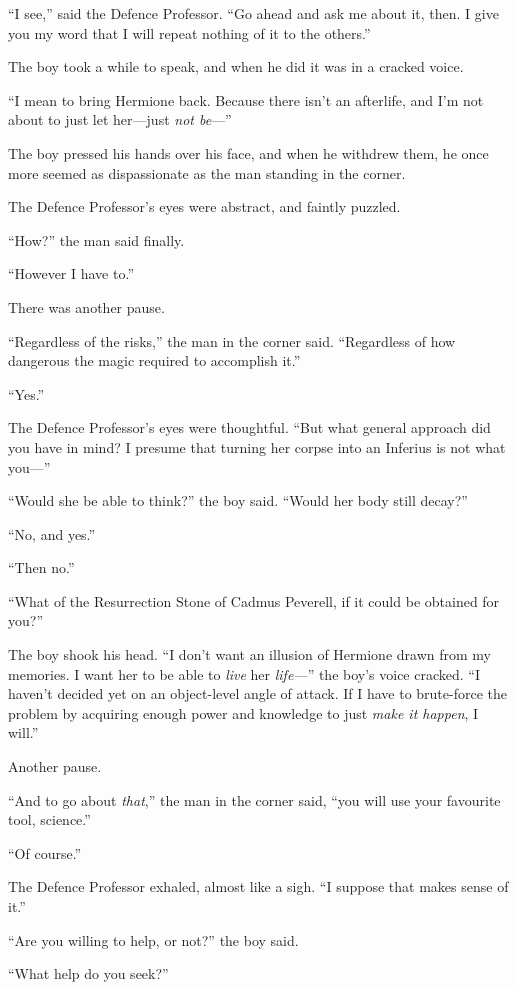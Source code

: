 “I see,” said the Defence Professor.
“Go ahead and ask me about it, then. I give you my word that I will repeat nothing of it to the others.”

The boy took a while to speak, and when he did it was in a cracked voice.

“I mean to bring Hermione back. Because there isn’t an afterlife, and I’m not about to just let her—just \emph{not be}—”

The boy pressed his hands over his face, and when he withdrew them, he once more seemed as dispassionate as the man standing in the corner.

The Defence Professor’s eyes were abstract, and faintly puzzled.

“How?” the man said finally.

“However I have to.”

There was another pause.

“Regardless of the risks,” the man in the corner said.
“Regardless of how dangerous the magic required to accomplish it.”

“Yes.”

The Defence Professor’s eyes were thoughtful.
“But what general approach did you have in mind? I presume that turning her corpse into an Inferius is not what you—”

“Would she be able to think?” the boy said.
“Would her body still decay?”

“No, and yes.”

“Then no.”

“What of the Resurrection Stone of Cadmus Peverell, if it could be obtained for you?”

The boy shook his head.
“I don’t want an illusion of Hermione drawn from my memories. I want her to be able to \emph{live} her \emph{life—}” the boy’s voice cracked.
“I haven’t decided yet on an object-level angle of attack. If I have to brute-force the problem by acquiring enough power and knowledge to just \emph{make it happen}, I will.”

Another pause.

“And to go about \emph{that},” the man in the corner said, “you will use your favourite tool, science.”

“Of course.”

The Defence Professor exhaled, almost like a sigh.
“I suppose that makes sense of it.”

“Are you willing to help, or not?” the boy said.

“What help do you seek?”


